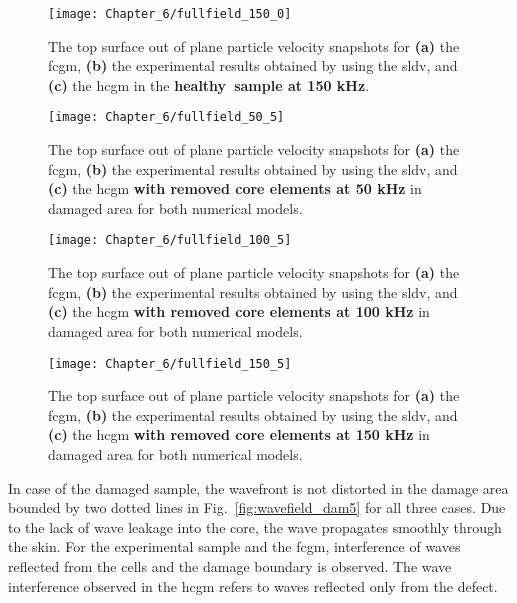 \begin{figure}[!hbt]
	\begin{center}
		\texttt{[image: Chapter\_6/fullfield\_150\_0]}
	\end{center}
	\caption{The top surface out of plane particle velocity snapshots for \textbf{(a)} the \acf{fcgm}, \textbf{(b)} the experimental results obtained by using the \acf{sldv}, and \textbf{(c)} the \acf{hcgm} in the \textbf{healthy~sample at 150 kHz}.}
	\label{fig:fullfield_150_0}
\end{figure}
\begin{figure}[!hbt]
	\begin{center}
		\texttt{[image: Chapter\_6/fullfield\_50\_5]}
	\end{center}
	\caption{The top surface out of plane particle velocity snapshots for \textbf{(a)} the \acf{fcgm}, \textbf{(b)} the experimental results obtained by using the \acf{sldv}, and \textbf{(c)} the \acf{hcgm} \textbf{with removed core elements at 50 kHz} in damaged area for both numerical models.}
	\label{fig:fullfield_50_5}
\end{figure}

\begin{figure}[!hbt]
	\begin{center}
		\texttt{[image: Chapter\_6/fullfield\_100\_5]}
	\end{center}
	\caption{The top surface out of plane particle velocity snapshots for \textbf{(a)} the \acf{fcgm}, \textbf{(b)} the experimental results obtained by using the \acf{sldv}, and \textbf{(c)} the \acf{hcgm} \textbf{with removed core elements at 100 kHz} in damaged area for both numerical models.}
	\label{fig:fullfield_100_5}
\end{figure}
\begin{figure}[!hbt]
	\begin{center}
		\texttt{[image: Chapter\_6/fullfield\_150\_5]}
	\end{center}
	\caption{The top surface out of plane particle velocity snapshots for \textbf{(a)} the \acf{fcgm}, \textbf{(b)} the experimental results obtained by using the \acf{sldv}, and \textbf{(c)} the \acf{hcgm} \textbf{with removed core elements at 150 kHz} in damaged area for both numerical models.}
	\label{fig:fullfield_150_5}
\end{figure}
In case of the damaged sample, the wavefront is not distorted in the damage area bounded by two dotted lines in Fig.~\ref{fig:wavefield_dam5} for all three cases.
Due to the lack of wave leakage into the core, the wave propagates smoothly through the skin.
For the experimental sample and the \ac{fcgm}, interference of waves reflected from the cells and the damage boundary is observed.
The wave interference observed in the \ac{hcgm} refers to waves reflected only from the defect.

